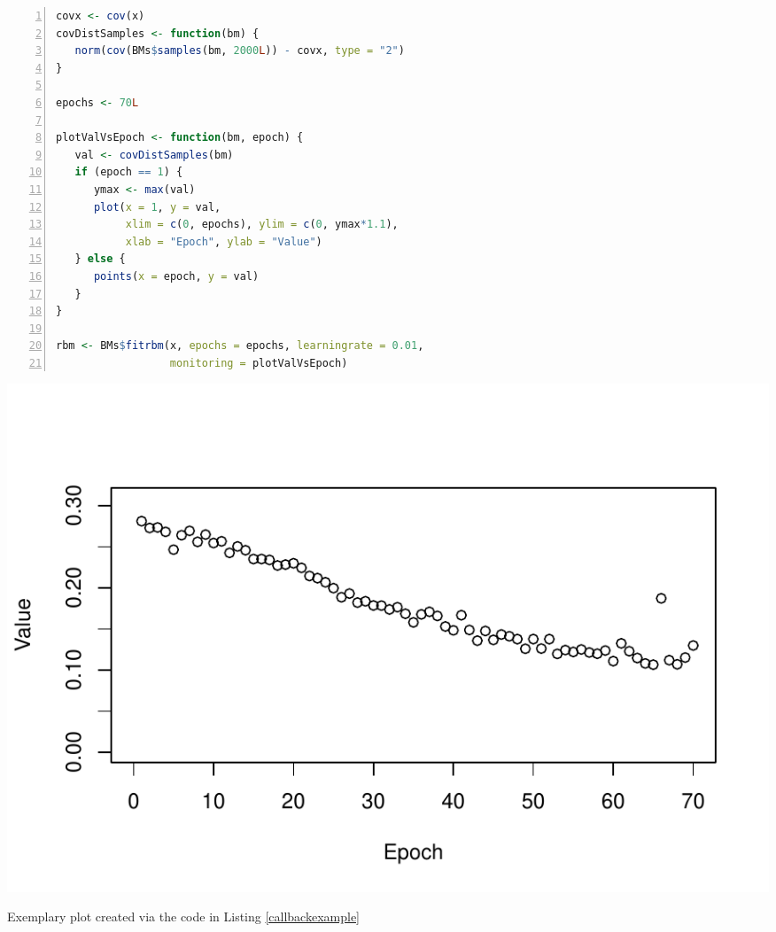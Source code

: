 \documentclass[12pt]{article}
\newcommand{\apkg}[1]{\emph{#1}}
\begin{document}
\noindent\begin{minipage}{\linewidth}
\captionsetup{type=listing}
\begin{lstlisting}[language=R, caption={Using an R function as a callback function during RBM training}, label={callbackexample}, numbers = left]
covx <- cov(x)
covDistSamples <- function(bm) {
   norm(cov(BMs$samples(bm, 2000L)) - covx, type = "2")
}

epochs <- 70L

plotValVsEpoch <- function(bm, epoch) {
   val <- covDistSamples(bm)
   if (epoch == 1) {
      ymax <- max(val)
      plot(x = 1, y = val,
           xlim = c(0, epochs), ylim = c(0, ymax*1.1),
           xlab = "Epoch", ylab = "Value")
   } else {
      points(x = epoch, y = val)
   }
}

rbm <- BMs$fitrbm(x, epochs = epochs, learningrate = 0.01,
                  monitoring = plotValVsEpoch)
\end{lstlisting}

\captionsetup{type=figure}
   \centering
   \includegraphics[scale=.95,trim={0cm 0.5cm 0cm 0cm}]{images/callbackplot.pdf}
   \caption{Exemplary plot created via the code in Listing \ref{callbackexample}}
\label{fig:callbackplot}
\end{minipage}
\clearpage




%
%
\end{document}
